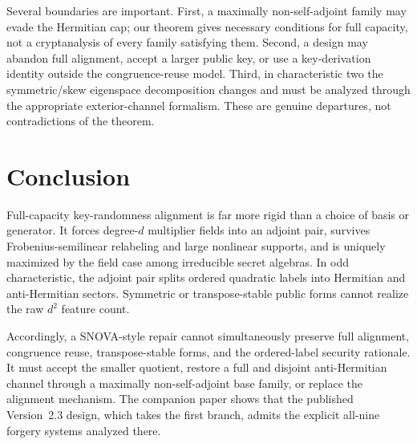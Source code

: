 \documentclass[11pt]{article}
\begin{document}
Several boundaries are important.  First, a maximally non-self-adjoint family
may evade the Hermitian cap; our theorem gives necessary conditions for full
capacity, not a cryptanalysis of every family satisfying them.  Second, a
design may abandon full alignment, accept a larger public key, or use a
key-derivation identity outside the congruence-reuse model.  Third, in
characteristic two the symmetric/skew eigenspace decomposition changes and
must be analyzed through the appropriate exterior-channel formalism.  These
are genuine departures, not contradictions of the theorem.

\section{Conclusion}
Full-capacity key-randomness alignment is far more rigid than a choice of
basis or generator.  It forces degree-$d$ multiplier fields into an adjoint
pair, survives Frobenius-semilinear relabeling and large nonlinear supports,
and is uniquely maximized by the field case among irreducible secret
algebras.  In odd characteristic, the adjoint pair splits ordered quadratic
labels into Hermitian and anti-Hermitian sectors.  Symmetric or
transpose-stable public forms cannot realize the raw $d^2$ feature count.

Accordingly, a SNOVA-style repair cannot simultaneously preserve full
alignment, congruence reuse, transpose-stable forms, and the ordered-label
security rationale.  It must accept the smaller quotient, restore a full and
disjoint anti-Hermitian channel through a maximally non-self-adjoint base
family, or replace the alignment mechanism.  The companion paper shows that
the published Version~2.3 design, which takes the first branch, admits the
explicit all-nine forgery systems analyzed there.

\printbibliography
\end{document}
